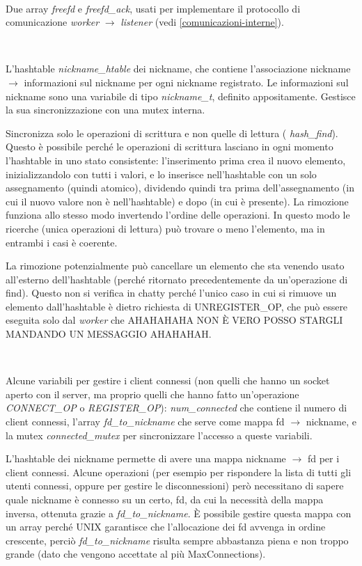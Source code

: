\documentclass[a4paper]{article}
\theoremstyle{theorem}
\theoremstyle{remark}
\theoremstyle{definition}
\theoremstyle{corollary}
\theoremstyle{lemma}
\newcommand\codeName[1]{%
	\textit{#1}}
\begin{document}
\

Due array \codeName{freefd} e \codeName{freefd\_ack}, usati per implementare il protocollo di comunicazione \codeName{worker} $\rightarrow$ \codeName{listener} (vedi \autoref{comunicazioni-interne}).

\

L'hashtable \codeName{nickname\_htable} dei nickname, che contiene l'associazione nickname $\rightarrow$ informazioni sul nickname per ogni nickname registrato. Le informazioni sul nickname sono una variabile di tipo \codeName{nickname\_t}, definito appositamente. Gestisce la sua sincronizzazione con una mutex interna.

Sincronizza solo le operazioni di scrittura e non quelle di lettura (\codeName{hash\_find}). Questo è possibile perché le operazioni di scrittura lasciano in ogni momento l'hashtable in uno stato consistente: l'inserimento prima crea il nuovo elemento, inizializzandolo con tutti i valori, e lo inserisce nell'hashtable con un solo assegnamento (quindi atomico), dividendo quindi tra prima dell'assegnamento (in cui il nuovo valore non è nell'hashtable) e dopo (in cui è presente). La rimozione funziona allo stesso modo invertendo l'ordine delle operazioni. In questo modo le ricerche (unica operazioni di lettura) può trovare o meno l'elemento, ma in entrambi i casi è coerente.

La rimozione potenzialmente può cancellare un elemento che sta venendo usato all'esterno dell'hashtable (perché ritornato precedentemente da un'operazione di find). Questo non si verifica in chatty perché l'unico caso in cui si rimuove un elemento dall'hashtable è dietro richiesta di UNREGISTER\_OP, che può essere eseguita solo dal \codeName{worker} che AHAHAHAHA NON È VERO POSSO STARGLI MANDANDO UN MESSAGGIO AHAHAHAH.

\

Alcune variabili per gestire i client connessi (non quelli che hanno un socket aperto con il server, ma proprio quelli che hanno fatto un'operazione \codeName{CONNECT\_OP} o \codeName{REGISTER\_OP}): \codeName{num\_connected} che contiene il numero di client connessi, l'array \codeName{fd\_to\_nickname} che serve come mappa fd $\rightarrow$ nickname, e la mutex \codeName{connected\_mutex} per sincronizzare l'accesso a queste variabili.

L'hashtable dei nickname permette di avere una mappa nickname $\rightarrow$ fd per i client connessi. Alcune operazioni (per esempio per rispondere la lista di tutti gli utenti connessi, oppure per gestire le disconnessioni) però necessitano di sapere quale nickname è connesso su un certo, fd, da cui la necessità della mappa inversa, ottenuta grazie a \codeName{fd\_to\_nickname}. È possibile gestire questa mappa con un array perché UNIX garantisce che l'allocazione dei fd avvenga in ordine crescente, perciò \codeName{fd\_to\_nickname} risulta sempre abbastanza piena e non troppo grande (dato che vengono accettate al più MaxConnections).
\end{document}
